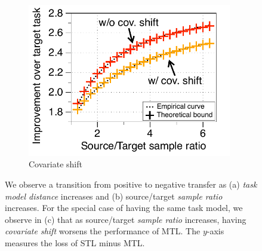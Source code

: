 \begin{figure}[!t]
\begin{subfigure}[b]{0.32\textwidth}
		\centering
		\includegraphics[width=0.98\textwidth]{figures/complementary.pdf}
		\vspace{-0.075in}
		\caption{Covariate shift}
		\label{fig_covariate}
	\end{subfigure}
	\caption{%
	We observe a transition from positive to negative transfer as (a) \textit{task model distance} increases and (b) source/target \textit{sample ratio} increases.
	For the special case of having the same task model, we observe in (c) that as source/target \textit{sample ratio} increases, having \textit{covariate shift} worsens the performance of MTL.
	The $y$-axis measures the loss of STL minus MTL.}
	\label{fig_model_shift_phasetrans}
	\vspace{-0.3in}
\end{figure}





